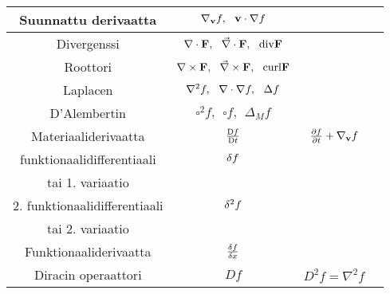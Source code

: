 \documentclass[../johdoksia.tex]{subfiles}
\begin{document}
\begin{table}
\begin{tabular}{|c|c|c|c|}
			\hline
			Suunnattu derivaatta & $\nabla_{\mathbf{v}}f, \ \ \mathbf{v}\cdot\nabla f$ & & \\
			\hline
			Divergenssi & $\divop \mathbf{F}, \ \ \vec{\nabla}\cdot \mathbf{F}, \ \ \mathrm{div}\mathbf{F}$ & & \\
			\hline
			Roottori & $\curlop \mathbf{F}, \ \ \vec{\nabla}\times \mathbf{F}, \ \ \mathrm{curl}\mathbf{F}$ & & \\
			\hline
			Laplacen & $\nabla^2f, \ \ \divop\nabla f, \ \ \Delta f$ & & \\
			\hline
			D'Alembertin & $\square^2f, \ \ \square f, \ \ \Delta_Mf$ & & \\
			\hline
			Materiaaliderivaatta & $\mdv{f}{t}$ & $\pdv{f}{t} + \nabla_{\mathbf{v}}f$ & \\
			\hline
			funktionaalidifferentiaali & $\fdif{f}$ & & \\
			tai 1. variaatio & & & \\
			\hline
			2. funktionaalidifferentiaali & $\fdif[order=2]{f}$ & &  \\
			tai 2. variaatio & & & \\
			\hline
			Funktionaaliderivaatta & $\fdv{f}{x}$ & & \\
			\hline
			Diracin operaattori & $Df$ & $D^2f = \nabla^2f$ & \\
			\hline
		\end{tabular}
	\end{table}
\end{document}
